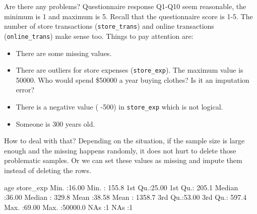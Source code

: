 \documentclass[
  12pt,
]{krantz}
\makeatletter
\newenvironment{Shaded}{\begin{snugshade}}{\end{snugshade}}
\newcommand{\AttributeTok}[1]{\textcolor[rgb]{0.61,0.61,0.61}{#1}}
\newcommand{\CommentTok}[1]{\textcolor[rgb]{0.37,0.37,0.37}{\textit{#1}}}
\newcommand{\ConstantTok}[1]{\textcolor[rgb]{0,0,0}{#1}}
\newcommand{\DecValTok}[1]{\textcolor[rgb]{0.06,0.06,0.06}{#1}}
\newcommand{\FunctionTok}[1]{\textcolor[rgb]{0,0,0}{#1}}
\newcommand{\NormalTok}[1]{#1}
\newcommand{\OtherTok}[1]{\textcolor[rgb]{0.37,0.37,0.37}{#1}}
\newcommand{\SpecialCharTok}[1]{\textcolor[rgb]{0,0,0}{#1}}
\newcommand{\StringTok}[1]{\textcolor[rgb]{0.5,0.5,0.5}{#1}}
\providecommand{\tightlist}{%
  \setlength{\itemsep}{0pt}\setlength{\parskip}{0pt}}
\newenvironment{kframe}{%
\medskip{}
\setlength{\fboxsep}{.8em}
 \def\at@end@of@kframe{}%
 \ifinner\ifhmode%
  \def\at@end@of@kframe{\end{minipage}}%
  \begin{minipage}{\columnwidth}%
 \fi\fi%
 \def\FrameCommand##1{\hskip\@totalleftmargin \hskip-\fboxsep
 \colorbox{shadecolor}{##1}\hskip-\fboxsep
     \hskip-\linewidth \hskip-\@totalleftmargin \hskip\columnwidth}%
 \MakeFramed {\advance\hsize-\width
   \@totalleftmargin\z@ \linewidth\hsize
   \@setminipage}}%
 {\par\unskip\endMakeFramed%
 \at@end@of@kframe}
\renewenvironment{Shaded}{\begin{kframe}}{\end{kframe}}
\makeatother
\begin{document}
Are there any problems? Questionnaire response Q1-Q10 seem reasonable, the minimum is 1 and maximum is 5. Recall that the questionnaire score is 1-5. The number of store transactions (\texttt{store\_trans}) and online transactions (\texttt{online\_trans}) make sense too. Things to pay attention are:

\begin{itemize}
\tightlist
\item
  There are some missing values.
\item
  There are outliers for store expenses (\texttt{store\_exp}). The maximum value is 50000. Who would spend \$50000 a year buying clothes? Is it an imputation error?
\item
  There is a negative value ( -500) in \texttt{store\_exp} which is not logical.
\item
  Someone is 300 years old.
\end{itemize}

How to deal with that? Depending on the situation, if the sample size is large enough and the missing happens randomly, it does not hurt to delete those problematic samples. Or we can set these values as missing and impute them instead of deleting the rows.

\begin{Shaded}
\end{Shaded}

\begin{Shaded}
\begin{Highlighting}[]
\NormalTok{      age          store\_exp      }
\NormalTok{ Min.   :16.00   Min.   :  155.8  }
\NormalTok{ 1st Qu.:25.00   1st Qu.:  205.1  }
\NormalTok{ Median :36.00   Median :  329.8  }
\NormalTok{ Mean   :38.58   Mean   : 1358.7  }
\NormalTok{ 3rd Qu.:53.00   3rd Qu.:  597.4  }
\NormalTok{ Max.   :69.00   Max.   :50000.0  }
\NormalTok{ NA\textquotesingle{}s   :1       NA\textquotesingle{}s   :1        }
\end{Highlighting}
\end{Shaded}
\end{document}
